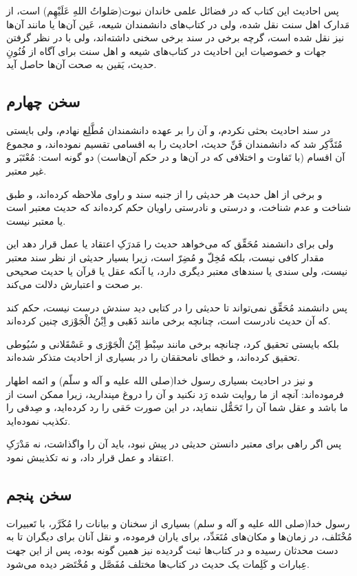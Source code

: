 پس احادیث این کتاب که در فضائل علمی خاندان نبوت(صَلواتُ اللهِ عَلَیْهِم) است،
از مَدارک اهل سنت نقل شده، ولی در کتاب‌های دانشمندان شیعه، عَین آن‌ها یا
مانند آن‌ها نیز نقل شده است، گرچه برخی در سند برخی سخنی داشته‌اند، ولی
با در نظر گرفتن جهات و خصوصیات این احادیث در کتاب‌های شیعه و اهل سنت
برای آگاه از فُنُونِ حدیث، یَقین به صحت آن‌ها حاصل آید.

\subsection*{سخن چهارم}

در سند احادیث بحثی نکردم، و آن را بر عهده دانشمندان مُطَّلِع نهادم، ولی
بایستی مُتَذَّکِر شد که دانشمندان فَنِّ حدیث، احادیث را به اقسامی تقسیم
نموده‌اند، و مجموع آن اقسام (با تَفاوت و اختلافی که در آن‌ها و در حکم
آن‌هاست) دو گونه است: مُعْتَبَر و غیر معتبر.

و برخی از اهل حدیث هر حدیثی را از جنبه سند و راوی ملاحظه کرده‌اند، و
طبق شناخت و عدم شناخت،‌ و درستی و نادرستی راویان حکم کرده‌اند که حدیث
معتبر است یا معتبر نیست.

ولی برای دانشمند مُحَقِّق که می‌خواهد حدیث را مَدرَکِ اعتقاد یا عمل قرار دهد
این مقدار کافی نیست، بلکه مُخِلّ و مُضِرّ است، زیرا بسیار حدیثی از نظر سند
معتبر نیست، ولی سندی یا سندهای معتبر دیگری دارد، یا آنکه عقل یا قرآن
یا حدیث صحیحی بر صحت و اعتبارش دلالت می‌کند.

پس دانشمند مُحَقِّق نمی‌تواند تا حدیثی را در کتابی دید سندش درست نیست، حکم
کند که آن حدیث نادرست است، چنانچه برخی مانند ذَهَبی و اِبْنُ الْجَوْزی چنین
کرده‌اند.

بلکه بایستی تحقیق کرد، چنانچه برخی مانند سِبْطِ اِبْنُ الْجَوْزی و عَسْقَلانی و
سُیُوطی تحقیق کرده‌اند، و خطای نامحققان را در بسیاری از احادیث متذکر
شده‌اند.

و نیز در احادیث بسیاری رسول خدا(صلی الله علیه و آله و سلّم) و ائمه
اطهار فرموده‌اند: آنچه از ما روایت شده رَد نکنید و آن را دروغ مپندارید،
زیرا ممکن است از ما باشد و عقل شما آن را تَحَمُّل ننماید، در این صورت حَقی
را رد کرده‌اید، و صِدقی را تکذیب نموده‌اید.

پس اگر راهی برای معتبر دانستن حدیثی در پیش نبود، باید آن را واگذاشت،
نه مَدْرَکِ اعتقاد و عمل قرار داد، و نه تکذیبش نمود.

\subsection*{سخن پنجم}

رسول خدا(صلی الله علیه و آله و سلم) بسیاری از سخنان و بیانات را مُکَرَّر،
با تَعبیرات مُخْتَلف، در زمان‌ها و مکان‌های مُتَعَدِّد، برای یاران فرموده، و نقل
آنان برای دیگران تا به دست محدثان رسیده و در کتاب‌ها ثبت گردیده نیز
همین گونه بوده، پس از این جهت عِبارات و کَلِمات یک حدیث در کتاب‌ها مختلف
مُفَصَّل و مُخْتَصَر دیده می‌شود.

